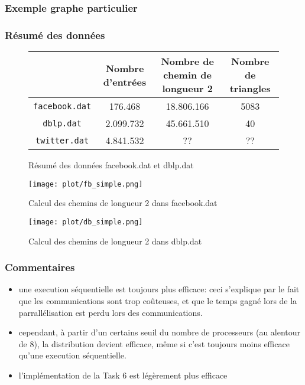 \documentclass[12pt]{article}
\begin{document}
\subsubsection*{Exemple graphe particulier}


\subsubsection*{Résumé des données}
\begin{figure}[H]
  \centering
  \begin{tabular}{cccc}
    & Nombre d'entrées & Nombre de chemin de longueur 2& Nombre de triangles \\
    \hline
    \verb?facebook.dat? &  176.468 & 18.806.166 & 5083\\
    \hline
    \verb?dblp.dat? & 2.099.732 & 45.661.510 & 40\\
    \hline
    \verb?twitter.dat? & 4.841.532 & ?? & ??\\
  \end{tabular}
  \caption{\label{fig:table} Résumé des données facebook.dat et dblp.dat}
\end{figure}


\begin{multicols}{2}
\begin{figure}[H]
  \centering
  \texttt{[image: plot/fb\_simple.png]}
  \caption{\label{fig:fb_simple} Calcul des chemins de longueur 2 \hspace*{4cm} dans facebook.dat }
\end{figure}

\begin{figure}[H]
  \centering
  \texttt{[image: plot/db\_simple.png]}
  \caption{\label{fig:fb_simple} Calcul des chemins de longueur 2 \hspace*{4cm} dans dblp.dat }
\end{figure}

\end{multicols}

\subsubsection*{Commentaires}
\begin{itemize}
\item une execution séquentielle est toujours plus efficace: ceci s'explique par le fait que les communications sont trop coûteuses, et que le temps gagné lors de la parrallélisation est perdu lors des communications. 
\item cependant, à partir d'un certains seuil du nombre de processeurs (au alentour de 8), la distribution devient efficace, même si c'est toujours moins efficace qu'une execution séquentielle.
\item l'implémentation de la Task 6 est légèrement plus efficace
\end{itemize}
\end{document}
